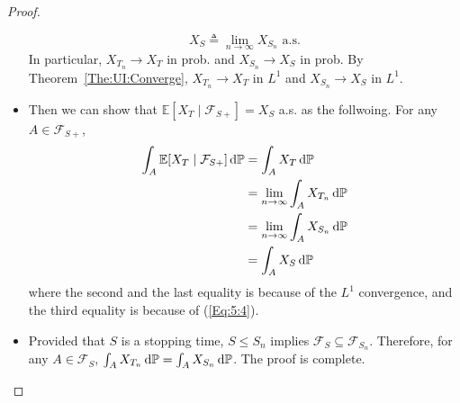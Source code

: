 \begin{proof}
\begin{itemize}
\[X_S\triangleq \lim_{n\to\infty}X_{S_n} \text{ a.s.}
\]
In particular, $X_{T_n}\to X_T$ in prob. and $X_{S_n}\to X_S$ in prob.
By Theorem~\ref{The:UI:Converge}, $X_{T_n}\to X_T$ in $L^1$ and $X_{S_n}\to X_S$ in $L^1$.
\item
Then we can show that $\mathbb{E}[X_T\mid\mathcal{F}_{S+}]=X_S$ a.s. as the follwoing.
For any $A\in\mathcal{F}_{S+}$,
\begin{align*}
\int_A\mathbb{E}[X_T\mid\mathcal{F}_{S+}]\,\mathrm{d}\mathbb{P}
&=\int_AX_T\,\mathrm{d}\mathbb{P}\\
&=\lim_{n\to\infty}\int_AX_{T_n}\,\mathrm{d}\mathbb{P}\\
&=\lim_{n\to\infty}\int_AX_{S_n}\,\mathrm{d}\mathbb{P}\\
&=\int_AX_S\,\mathrm{d}\mathbb{P}
\end{align*}
where the second and the last equality is because of the $L^1$ convergence, and the third equality is because of (\ref{Eq:5:4}).
\item
Provided that $S$ is a stopping time, $S\le S_n$ implies $\mathcal{F}_S\subseteq\mathcal{F}_{S_n}$. Therefore, for any $A\in\mathcal{F}_S$, $\int_AX_{T_n}\,\mathrm{d}\mathbb{P}=\int_AX_{S_n}\,\mathrm{d}\mathbb{P}$. The proof is complete.

\end{itemize}






\end{proof}










